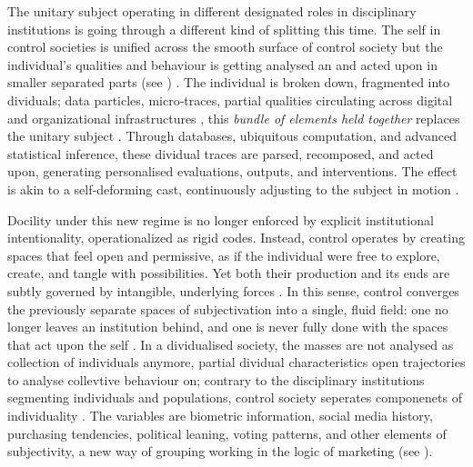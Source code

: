 The unitary subject operating in different designated roles in disciplinary institutions is going through a different kind of splitting this time. The self in control societies is unified across the smooth surface of control society but the individual's qualities and behaviour is getting analysed an and acted upon in smaller separated parts (see \cite[5]{mackenzie2021}) . The individual is broken down, fragmented into dividuals; data particles, micro‑traces, partial qualities circulating across digital and organizational infrastructures \parencite{deleuze1992a}, this \textit{bundle of elements held together} replaces the unitary subject \parencite[6]{mackenzie2021}.
 Through databases, ubiquitous computation, and advanced statistical inference, these dividual traces are parsed, recomposed, and acted upon, generating personalised evaluations, outputs, and interventions. The effect is akin to a self‑deforming cast, continuously adjusting to the subject in motion \parencite[4]{deleuze1992a}.

Docility under this new regime is no longer enforced by explicit institutional intentionality, operationalized as rigid codes. Instead, control operates by creating spaces that feel open and permissive, as if the individual were free to explore, create, and tangle with possibilities. Yet both their production and its ends are subtly governed by intangible, underlying forces \parencite[75]{hui2015}. In this sense, control converges the previously separate spaces of subjectivation into a single, fluid field: one no longer leaves an institution behind, and one is never fully done with the spaces that act upon the self \parencite[6]{deleuze1992a}. In a dividualised society, the masses are not analysed as collection of individuals anymore, partial dividual characteristics open trajectories to analyse collevtive behaviour on; contrary to the disciplinary institutions segmenting individuals and populations, control society seperates componenets of individuality \parencite[9]{mackenzie2021} . The variables are biometric information, social media history, purchasing tendencies, political leaning, voting patterns, and other elements of subjectivity, a new way of grouping working in the logic of marketing (see \cite[7]{deleuze1992a}).


